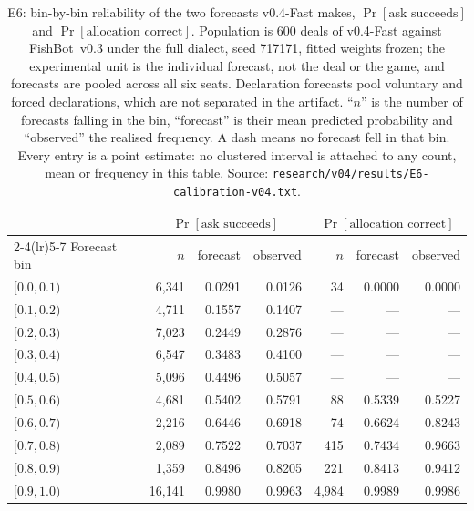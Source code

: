 \documentclass[11pt]{article}
\theoremstyle{definition}
\DeclareRobustCommand{\vfast}{\texorpdfstring{\mbox{v0.4-Fast}}{v0.4-Fast}}
\DeclareRobustCommand{\vthree}{\texorpdfstring{\mbox{FishBot v0.3}}{FishBot v0.3}}
\newcommand{\numCalibDeals}{600}
\begin{document}
\begin{table}[ht]
\centering
\caption{E6: bin-by-bin reliability of the two forecasts \vfast{} makes,
$\Pr[\text{ask succeeds}]$ and $\Pr[\text{allocation correct}]$. Population is
\numCalibDeals{} deals of \vfast{} against \vthree{} under the full dialect, seed 717171,
fitted weights frozen; the experimental unit is the individual forecast, not the
deal or the game, and forecasts are pooled across all six seats. Declaration
forecasts pool voluntary and forced declarations, which are not separated in the
artifact. ``$n$'' is the number of forecasts falling in the bin, ``forecast'' is
their mean predicted probability and ``observed'' the realised frequency. A dash
means no forecast fell in that bin. Every entry is a point estimate: no
clustered interval is attached to any count, mean or frequency in this table.
Source: \texttt{research/v04/results/E6-calibration-v04.txt}.}
\label{tab:reliability}
\small
\begin{tabular}{lrrrrrr}
\toprule
& \multicolumn{3}{c}{$\Pr[\text{ask succeeds}]$} & \multicolumn{3}{c}{$\Pr[\text{allocation correct}]$} \\
\cmidrule(lr){2-4}\cmidrule(lr){5-7}
Forecast bin & $n$ & forecast & observed & $n$ & forecast & observed \\
\midrule
$[0.0, 0.1)$ & 6{,}341 & 0.0291 & 0.0126 & 34 & 0.0000 & 0.0000 \\
$[0.1, 0.2)$ & 4{,}711 & 0.1557 & 0.1407 & --- & --- & --- \\
$[0.2, 0.3)$ & 7{,}023 & 0.2449 & 0.2876 & --- & --- & --- \\
$[0.3, 0.4)$ & 6{,}547 & 0.3483 & 0.4100 & --- & --- & --- \\
$[0.4, 0.5)$ & 5{,}096 & 0.4496 & 0.5057 & --- & --- & --- \\
$[0.5, 0.6)$ & 4{,}681 & 0.5402 & 0.5791 & 88 & 0.5339 & 0.5227 \\
$[0.6, 0.7)$ & 2{,}216 & 0.6446 & 0.6918 & 74 & 0.6624 & 0.8243 \\
$[0.7, 0.8)$ & 2{,}089 & 0.7522 & 0.7037 & 415 & 0.7434 & 0.9663 \\
$[0.8, 0.9)$ & 1{,}359 & 0.8496 & 0.8205 & 221 & 0.8413 & 0.9412 \\
$[0.9, 1.0)$ & 16{,}141 & 0.9980 & 0.9963 & 4{,}984 & 0.9989 & 0.9986 \\
\bottomrule
\end{tabular}%
\end{table}
\end{document}
